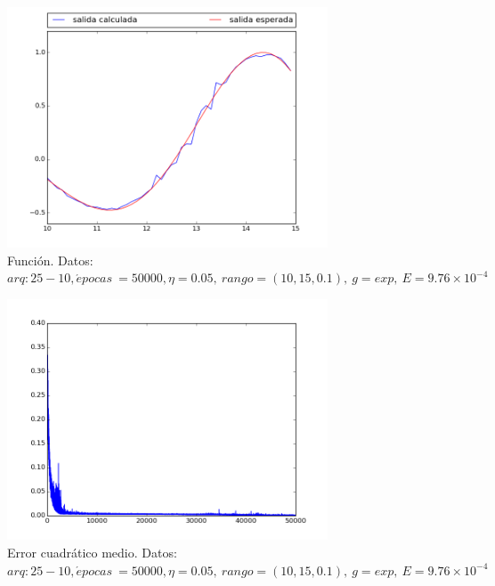 \documentclass[12pt,a4paper]{article}
\begin{document}
\begin{figure}[H]
\centering
\includegraphics[width=0.85\textwidth]{img/_25__10_-eta_0_05-exp-FUNCTION.png}
\caption{\label{fig:test10-15-exp-fn-25} Función. Datos:  $arq: 25-10, \acute{e} pocas \ = 50000, \eta = 0.05,\ rango=(10, 15, 0.1),\ g=exp, \ E = 9.76 \times 10^{-4}$}
\end{figure}

\begin{figure}[H]
\centering
\includegraphics[width=0.85\textwidth]{img/_25__10_-eta_0_05-exp-ERROR.png}
\caption{\label{fig:test10-15-exp-error-25}  Error cuadrático medio. Datos:  $arq: 25-10, \acute{e} pocas \ = 50000, \eta = 0.05,\ rango=(10, 15, 0.1),\ g=exp, \ E = 9.76 \times 10^{-4}$}
\end{figure}
\end{document}
